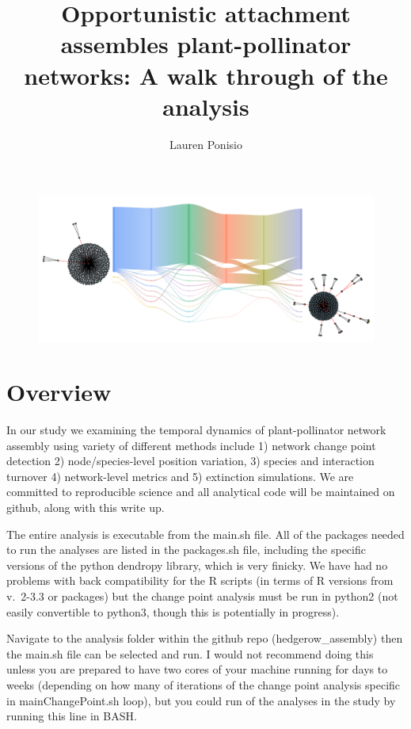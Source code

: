 \documentclass{article}\usepackage[]{graphicx}\usepackage[]{color}
\begin{document}
\title{Opportunistic attachment assembles plant-pollinator networks: A walk through of the analysis}
\author{Lauren Ponisio}

\maketitle

\begin{figure}[h!]
  \centering
  \includegraphics[width=1.1\textwidth]{figure/SankeyIDb303b2e99ce.pdf}
  \label{fig:methods}
\end{figure}
\clearpage

\section{Overview}
\label{sec:overview}

In our study we examining the temporal dynamics of plant-pollinator
network assembly using variety of different methods include 1) network
change point detection 2) node/species-level position variation, 3)
species and interaction turnover 4) network-level metrics and 5)
extinction simulations. We are committed to reproducible science and
all analytical code will be maintained on github, along with this
write up.

The entire analysis is executable from the main.sh file. All of the
packages needed to run the analyses are listed in the packages.sh
file, including the specific versions of the python dendropy library,
which is very finicky. We have had no problems with back compatibility
for the R scripts (in terms of R versions from v.~2-3.3 or packages)
but the change point analysis must be run in python2 (not easily
convertible to python3, though this is potentially in progress).

Navigate to the analysis folder within the github repo
(hedgerow\_assembly) then the main.sh file can be selected and
run. I would not recommend doing this unless you are prepared to have two
cores of your machine running for days to weeks (depending on how many
of iterations of the change point analysis specific in
mainChangePoint.sh loop), but you could run of the analyses in the
study by running this line in BASH.
\end{document}
